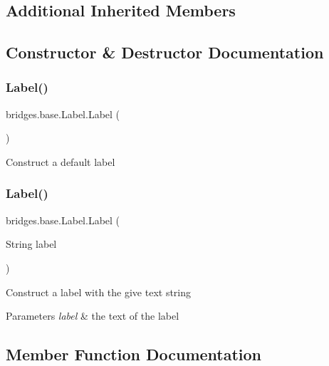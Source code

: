 \subsection*{Additional Inherited Members}


\subsection{Constructor \& Destructor Documentation}
\mbox{\label{classbridges_1_1base_1_1_label_adaed1c29dc02eb0f77d772b256b9eae4}} 
\subsubsection{\texorpdfstring{Label()}{Label()}\hspace{0.1cm}{\footnotesize\ttfamily [1/2]}}
{\footnotesize\ttfamily bridges.\+base.\+Label.\+Label (\begin{DoxyParamCaption}{ }\end{DoxyParamCaption})}

Construct a default label \mbox{\label{classbridges_1_1base_1_1_label_a0ffb2cdafae3f2c21e0925f2fe23df87}} 
\subsubsection{\texorpdfstring{Label()}{Label()}\hspace{0.1cm}{\footnotesize\ttfamily [2/2]}}
{\footnotesize\ttfamily bridges.\+base.\+Label.\+Label (\begin{DoxyParamCaption}\item[{String}]{label }\end{DoxyParamCaption})}

Construct a label with the give text string 
\begin{DoxyParams}{Parameters}
{\em label} & the text of the label \\
\hline
\end{DoxyParams}


\subsection{Member Function Documentation}
\mbox{\label{classbridges_1_1base_1_1_label_a476a68af051d561b805babc1d397b031}} 
